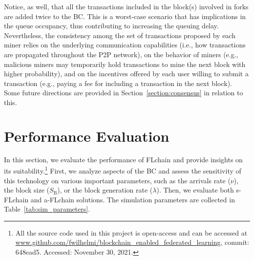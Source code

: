 \documentclass[10pt,journal,compsoc]{IEEEtran}
\begin{document}
Notice, as well, that all the transactions included in the block(s) involved in forks are added twice to the BC. This is a worst-case scenario that has implications in the queue occupancy, thus contributing to increasing the queuing delay. Nevertheless, the consistency among the set of transactions proposed by each miner relies on the underlying communication capabilities (i.e., how transactions are propagated throughout the P2P network), on the behavior of miners (e.g., malicious miners may temporarily hold transactions to mine the next block with higher probability), and on the incentives offered by each user willing to submit a transaction (e.g., paying a fee for including a transaction in the next block). Some future directions are provided in Section~\ref{section:consensus} in relation to this.


\section{Performance Evaluation}
\label{section:results}

In this section, we evaluate the performance of FLchain and provide insights on its suitability.\footnote{All the source code used in this project is open-access and can be accessed at \url{www.github.com/fwilhelmi/blockchain_enabled_federated_learning}, commit: 648ead5. Accessed: November 30, 2021.} First, we analyze aspects of the BC and assess the sensitivity of this technology on various important parameters, such as the arrivals rate ($\nu$), the block size ($S_\text{B}$), or the block generation rate ($\lambda$). Then, we evaluate both s-FLchain and a-FLchain solutions. The simulation parameters are collected in Table~\ref{tab:sim_parameters}.
\end{document}
